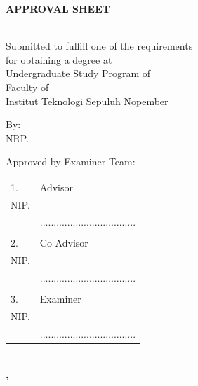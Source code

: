 \begin{center}
  \large
  \textbf{APPROVAL SHEET}
\end{center}

\begin{center}
  \textbf{\engtatitle{}}
\end{center}

\begingroup
\small

\begin{center}
  \textbf{\engdoctypename{}}
  \\Submitted to fulfill one of the requirements \\
  for obtaining a degree \engdegree{} at \\
  Undergraduate Study Program of \engstudyprogram{} \\
  Faculty of \engfaculty{} \\
  Institut Teknologi Sepuluh Nopember
\end{center}

\begin{center}
  By: \textbf{\name{}}
  \\NRP. \nrp{}
\end{center}

\begin{center}
  Approved by \engdoctypename{} Examiner Team:
\end{center}

\begingroup
\setlength{\tabcolsep}{0pt}

\noindent
\begin{tabularx}{\textwidth}{X l}
  1. \advisor{}               & Advisor                             \\
  \hspace*{1.5em}NIP. \advisornip{}       &                                     \\
                              & ................................... \\
                              &                                     \\
  2. \coadvisor{}             & Co-Advisor                          \\
  \hspace*{1.5em}NIP. \coadvisornip{}     &                                     \\
                              & ................................... \\
                              &                                     \\
  3. \examinerone{}           & Examiner                            \\
  \hspace*{1.5em}NIP. \examineronenip{}   &                                     \\
                              & ................................... \\
\end{tabularx}
\endgroup

\vfill

\begin{center}
  \textbf{\MakeUppercase{\place{}}\\\ENGMONTH{}, \the\year{}}
\end{center}
\endgroup

